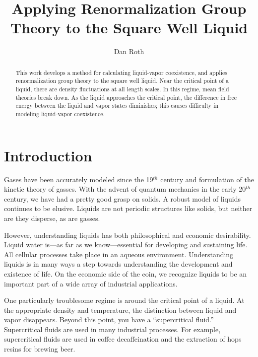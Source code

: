 \documentclass[letterpaper,twocolumn,amsmath,amssymb,prb]{revtex4-1}
\begin{document}
\title{Applying Renormalization Group Theory to the Square Well Liquid}

\author{Dan Roth}

\begin{abstract}

This work develops a method for calculating liquid-vapor coexistence,
and applies renormalization group theory to the square well
liquid. Near the critical point of a liquid, there are density
fluctuations at all length scales. In this regime, mean field theories
break down. As the liquid approaches the critical point, the
difference in free energy between the liquid and vapor states
diminishes; this causes difficulty in modeling liquid-vapor
coexistence.

\end{abstract}

\maketitle

\section{Introduction}
Gases have been accurately modeled since the 19$^{th}$
century\cite{Lederman92} and formulation of the kinetic theory of gasses. With the
advent of quantum mechanics in the early 20$^{th}$ century, we have
had a pretty good grasp on solids. A robust model of liquids continues
to be elusive. Liquids are not periodic structures like solids, but
neither are they disperse, as are gasses.

However, understanding liquids has both philosophical and economic
desirability. Liquid water is---as far as we know---essential for
developing and sustaining life. All cellular processes take place in an
aqueous environment. Understanding liquids is in many ways a step
towards understanding the development and existence of life. On the
economic side of the coin, we recognize liquids to be an important
part of a wide array of industrial applications.

One particularly troublesome regime is around the critical point of a
liquid. At the appropriate density and temperature, the distinction
between liquid and vapor disappears. Beyond this point, you have a
``supercritical fluid.'' Supercritical fluids are used in many
industrial processes.\cite{Perrut00} For example, supercritical fluids
are used in coffee decaffeination and the extraction of hops resins
for brewing beer.
\end{document}
